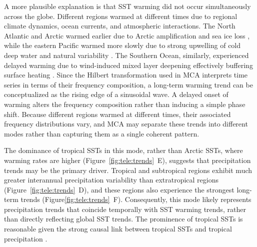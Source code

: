 A more plausible explanation is that SST warming did not occur simultaneously across the globe. Different regions warmed at different times due to regional climate dynamics, ocean currents, and atmospheric interactions. The North Atlantic and Arctic warmed earlier due to Arctic amplification and sea ice loss \cite{tokinaga_early_2017,hegerl_early_2018}, while the eastern Pacific warmed more slowly due to strong upwelling of cold deep water and natural variability \cite{heede_eastern_2021}. The Southern Ocean, similarly, experienced delayed warming due to wind-induced mixed layer deepening effectively buffering surface heating \cite{zhang_summer_2024}. Since the Hilbert transformation used in MCA interprets time series in terms of their frequency composition, a long-term warming trend can be conceptualized as the rising edge of a sinusoidal wave. A delayed onset of warming alters the frequency composition rather than inducing a simple phase shift. Because different regions warmed at different times, their associated frequency distributions vary, and MCA may separate these trends into different modes rather than capturing them as a single coherent pattern.

The dominance of tropical SSTs in this mode, rather than Arctic SSTs, where warming rates are higher (Figure~\ref{fig:tele:trends}~E), suggests that precipitation trends may be the primary driver. Tropical and subtropical regions exhibit much greater interannual precipitation variability than extratropical regions (Figure~\ref{fig:tele:trends}~D), and these regions also experience the strongest long-term trends (Figure\ref{fig:tele:trends}~F). Consequently, this mode likely represents precipitation trends that coincide temporally with SST warming trends, rather than directly reflecting global SST trends. The prominence of tropical SSTs is reasonable given the strong causal link between tropical SSTs and tropical precipitation \cite[e.g.][]{mcphaden_enso_2006}.


